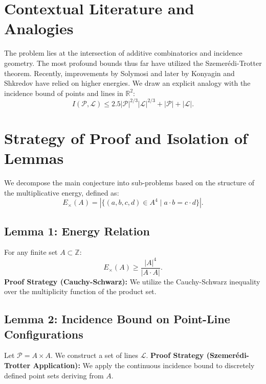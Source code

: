 \documentclass[11pt,a4paper]{article}
\begin{document}
\section{Contextual Literature and Analogies}
The problem lies at the intersection of additive combinatorics and incidence geometry. The most profound bounds thus far have utilized the Szemerédi-Trotter theorem.
Recently, improvements by Solymosi and later by Konyagin and Shkredov have relied on higher energies.
We draw an explicit analogy with the incidence bound of points and lines in $\mathbb{R}^2$:
\begin{equation}
I(\mathcal{P}, \mathcal{L}) \leq 2.5 |\mathcal{P}|^{2/3} |\mathcal{L}|^{2/3} + |\mathcal{P}| + |\mathcal{L}|.
\end{equation}

\section{Strategy of Proof and Isolation of Lemmas}
We decompose the main conjecture into sub-problems based on the structure of the multiplicative energy, defined as:
\begin{equation}
E_{\times}(A) = |\{(a,b,c,d) \in A^4 \mid a \cdot b = c \cdot d\}|.
\end{equation}

\subsection{Lemma 1: Energy Relation}
For any finite set $A \subset \mathbb{Z}$:
\begin{equation}
E_{\times}(A) \geq \frac{|A|^4}{|A \cdot A|}.
\end{equation}
\textbf{Proof Strategy (Cauchy-Schwarz):} We utilize the Cauchy-Schwarz inequality over the multiplicity function of the product set.

\subsection{Lemma 2: Incidence Bound on Point-Line Configurations}
Let $\mathcal{P} = A \times A$. We construct a set of lines $\mathcal{L}$.
\textbf{Proof Strategy (Szemerédi-Trotter Application):} We apply the continuous incidence bound to discretely defined point sets deriving from $A$.
\end{document}
